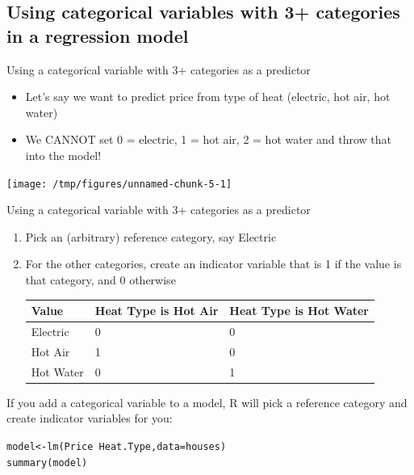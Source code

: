 \documentclass{beamer}\usepackage[]{graphicx}\usepackage[]{color}
\makeatletter
\newcommand{\hlopt}[1]{\textcolor[rgb]{1,0.894,0.769}{#1}}%
\newcommand{\hlstd}[1]{\textcolor[rgb]{1,0.894,0.769}{#1}}%
\newcommand{\hlkwb}[1]{\textcolor[rgb]{0.804,0.776,0.451}{#1}}%
\newcommand{\hlkwc}[1]{\textcolor[rgb]{0.78,0.941,0.545}{#1}}%
\newcommand{\hlkwd}[1]{\textcolor[rgb]{1,0.78,0.769}{#1}}%
\newenvironment{kframe}{%
 \def\at@end@of@kframe{}%
 \ifinner\ifhmode%
  \def\at@end@of@kframe{\end{minipage}}%
  \begin{minipage}{\columnwidth}%
 \fi\fi%
 \def\FrameCommand##1{\hskip\@totalleftmargin \hskip-\fboxsep
 \colorbox{shadecolor}{##1}\hskip-\fboxsep
     \hskip-\linewidth \hskip-\@totalleftmargin \hskip\columnwidth}%
 \MakeFramed {\advance\hsize-\width
   \@totalleftmargin\z@ \linewidth\hsize
   \@setminipage}}%
 {\par\unskip\endMakeFramed%
 \at@end@of@kframe}
\newenvironment{knitrout}{}{} %
\makeatother
\begin{document}
\begin{darkframes}
    \section{Using categorical variables with 3+ categories in a regression model}

    \begin{frame}{Using a categorical variable with 3+ categories as a predictor}
      \begin{itemize}
        \item Let's say we want to predict price from type of heat (electric, hot air, hot water)
        \item We CANNOT set 0 = electric, 1 = hot air, 2 = hot water and throw that into the model!
      \end{itemize}
      \pause
\begin{knitrout}
\color{fgcolor}
\texttt{[image: /tmp/figures/unnamed-chunk-5-1]} 

\end{knitrout}
    \end{frame}

    \begin{frame}{Using a categorical variable with 3+ categories as a predictor}
      \begin{enumerate}
        \item Pick an (arbitrary) \alert{reference category}, say Electric
        \item For the other categories, create an indicator variable that is 1 if the value is that category, and 0 otherwise
        \begin{tabular}{l|ll}
          Value & Heat Type is Hot Air & Heat Type is Hot Water \\ 
          \hline
          Electric & 0 & 0 \\
          Hot Air & 1 & 0 \\
          Hot Water & 0 & 1 \\
        \end{tabular}  
      \end{enumerate}
    \end{frame}

    \begin{frame}[fragile]
      \fontsm
      If you add a categorical variable to a model, R will pick a reference category and create indicator variables for you:
      \fontsize{8}{8}\selectfont
\begin{knitrout}
\color{fgcolor}\begin{kframe}
\begin{alltt}
\hlstd{model} \hlkwb{<-} \hlkwd{lm}\hlstd{(Price} \hlopt{~} \hlstd{Heat.Type,} \hlkwc{data}\hlstd{=houses)}
\hlkwd{summary}\hlstd{(model)}
\end{alltt}
\begin{verbatim}


\end{verbatim}
\end{kframe}
\end{knitrout}
\end{frame}
\end{darkframes}
\end{document}
